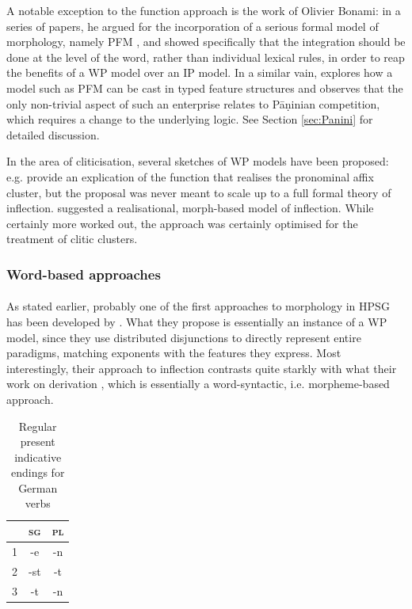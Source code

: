 A notable exception to the function approach is the work
of Olivier Bonami: in a series of papers, he argued for the
incorporation of a serious formal model of morphology, namely PFM
\citep{Stump01}, and showed specifically that the integration should
be done at the level of the word, rather than individual lexical
rules, in order to reap the benefits of a WP model over an IP model.
In a similar vain, \citet{Erjavec94} explores how a model such as PFM
can be cast in typed feature structures and observes that the only
non-trivial aspect of such an enterprise relates to Pāṇinian
competition, which requires a change to the underlying logic. See
Section \ref{sec:Panini} for detailed discussion. 

In the area of cliticisation, several sketches of WP models have been
proposed: e.g. \citet{Miller97} provide an explication of the function
that realises the pronominal affix cluster, but the proposal was never
meant to scale up to a full formal theory of
inflection. \citet{crysmann_b03book} suggested a realisational,
morph-based model of inflection. While certainly more worked out, the
approach was certainly optimised for the treatment of clitic
clusters. 



\subsubsection*{Word-based approaches}

\paragraph*{\citet{Krieger:Nerbonne:93}}
As stated earlier, probably one of the first approaches to morphology
in HPSG has been developed by \citet{Krieger:Nerbonne:93}. What they
propose is essentially an instance of a WP model, since they use
distributed disjunctions to directly represent entire paradigms,
matching exponents with the features they express. Most interestingly,
their approach to inflection contrasts quite starkly with what their
work on derivation \citep{Krieger:Nerbonne:93}, which is essentially a
word-syntactic, i.e. morpheme-based approach.


\begin{table}[htb]
  \centering
  \begin{tabular}{r|cc}
    \toprule
    & \textsc{sg} & \textsc{pl}\\
    \midrule
    1 & -e & -n\\
    2 & -st & -t\\
    3 & -t & -n\\
    \bottomrule
  \end{tabular}
  \caption{Regular present indicative endings for  German verbs}
  \label{tab:GermanEndings}
\end{table}

